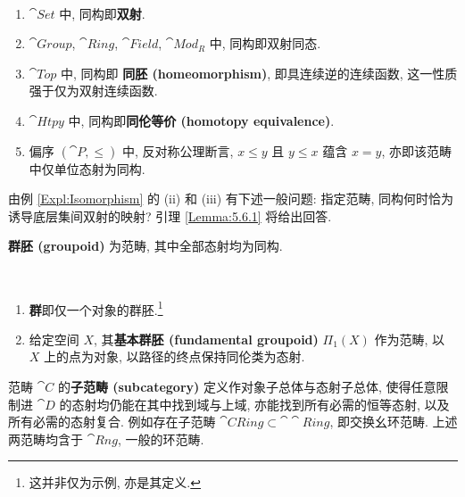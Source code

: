 \begin{example}\label{Expl:Isomorphism}
    \ \begin{enumerate}[label=(\roman*)]
        \item \(\cat{Set}\) 中, 同构即\textbf{双射}.
        \item \(\cat{Group}\), \(\cat{Ring}\), \(\cat{Field}\), \(\cat{Mod}_R\) 中, 同构即双射同态.
        \item \(\cat{Top}\) 中, 同构即 \textbf{同胚 (homeomorphism)}, 即具连续逆的连续函数, 这一性质强于仅为双射连续函数.
        \item \(\cat{Htpy}\) 中, 同构即\textbf{同伦等价 (homotopy equivalence)}.
        \item 偏序 \((\cat P,\le)\) 中, 反对称公理断言, \(x\le y\) 且 \(y\le x\) 蕴含 \(x=y\), 亦即该范畴中仅单位态射为同构.
    \end{enumerate}
\end{example}
\par 由例 \ref{Expl:Isomorphism} 的 (ii) 和 (iii) 有下述一般问题: 指定范畴, 同构何时恰为诱导底层集间双射的映射? 引理 \ref{Lemma:5.6.1} 将给出回答.
\begin{definition}\label{Def:Groupoid}
    \textbf{群胚 (groupoid)} 为范畴, 其中全部态射均为同构.
\end{definition}
\begin{example}
    \ \begin{enumerate}[label=(\roman*)]
        \item \textbf{群}即仅一个对象的群胚.\footnote{这并非仅为示例, 亦是其定义.\footnotemark}
        \item\label{Expl:Fundamental.Groupoid.FOR.Topological.Space} 给定空间 \(X\), 其\textbf{基本群胚 (fundamental groupoid)} \(\Pi _1(X)\) 作为范畴, 以 \(X\) 上的点为对象, 以路径的终点保持同伦类为态射.
    \end{enumerate}
\end{example}
\par 范畴 \(\cat C\) 的\textbf{子范畴 (subcategory)} 定义作对象子总体与态射子总体, 使得任意限制进 \(\cat D\) 的态射均仍能在其中找到域与上域, 亦能找到所有必需的恒等态射, 以及所有必需的态射复合. 例如存在子范畴 \(\cat{CRing}\subset\cat\cat{Ring}\), 即交换幺环范畴. 上述两范畴均含于 \(\cat{Rng}\),  一般的环范畴.
